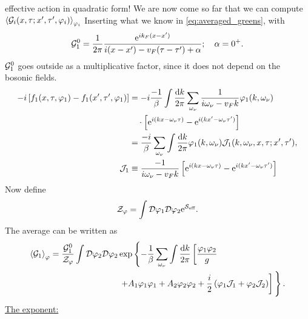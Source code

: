 effective action in quadratic form!
We are now come so far that we can compute \(\ev{\gre_i(x, \tau;x', \tau', \p_i)}_{\p_i}\)
Inserting what we know in \cref{eq:averaged_greens}, with \[\mathcal{G}_1^0 = \frac{1}{2\pi}\frac{\mathrm{e}^{ik_F(x-x')}}{i(x-x')-v_F(\tau-\tau') + \alpha} ; \quad \alpha = 0^+.\]
$\mathcal{G}_1^0$ goes outside as a multiplicative factor, since it does not depend on the bosonic fields. 
\begin{align*}
-i\left[f_1(x, \tau, \varphi_1) - f_1(x', \tau', \varphi_1)\right] &= -i\frac{-1}{\beta}\int\frac{\dd{k}}{2\pi}\sum_{\omega_\nu}\frac{1}{i\omega_\nu-v_Fk}\varphi_1(k, \omega_\nu) \\
&\quad\cdot\left[\mathrm{e}^{i(kx-\omega_\nu\tau)} - \mathrm{e}^{i(kx'-\omega_\nu\tau')}\right] \\
&=\frac{-i}{\beta}\sum_{\omega_\nu}\int\frac{\dd{k}}{2\pi}\varphi_1(k, \omega_\nu)\mathcal{J}_1(k, \omega_\nu, x, \tau;x', \tau'),\\
\mathcal{J}_1&\equiv \frac{-1}{i\omega_\nu-v_Fk} \left[\mathrm{e}^{i(kx-\omega_\nu\tau)} - \mathrm{e}^{i(kx'-\omega_\nu\tau')}\right]
\end{align*}
Now define 
\begin{equation}
\mathcal{Z}_\varphi = \int\mathcal{D}\varphi_1\mathcal{D}\varphi_2\mathrm{e}^{\mathcal{S}_{\text{eff}}}.
\end{equation}
The average can be written as
\begin{align*}
\ev{\gre_1}_\p = \frac{\gre_1^0}{\Z_\p} \int \D\p_2\D\p_2 &\exp \left\{ -\frac{1}{\beta}\sum_{\omega_\nu}\int\frac{\dd{k}}{2\pi} \left[\frac{\p_1\p_2}{g}\right.\right.\\
& \left.\left.+A_1\p_1\p_1+ A_2\p_2\p_2+ \frac{i}{2}\left(\p_1\J_1 + \p_2\J_2\right)\right]\vphantom{-\frac{1}{\beta}\sum_{\omega_\nu}\int\frac{\dd{k}}{2\pi} \left[\frac{\p_1\p_2}{g}\right. }\right\}.
\end{align*}
\underline{The exponent:}


